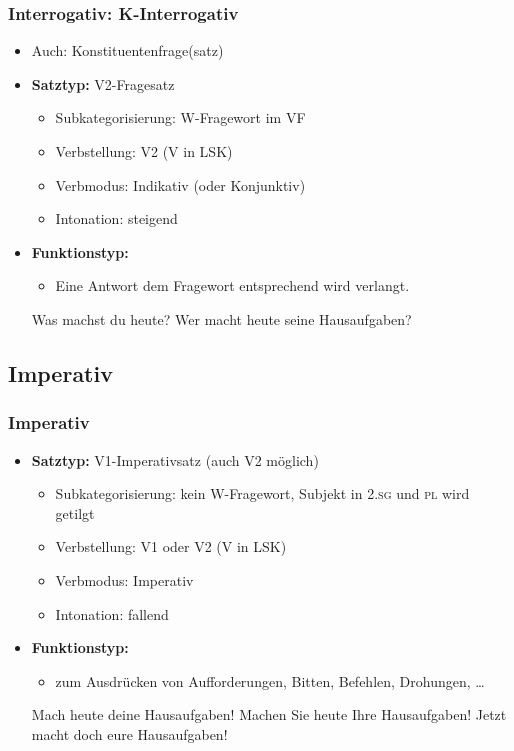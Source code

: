\begin{frame}
\frametitle{Interrogativ: K-Interrogativ}

\begin{itemize}
	\item Auch: Konstituentenfrage(satz)
	\item \textbf{Satztyp:} V2-Fragesatz
	\begin{itemize}
		\item Subkategorisierung: W-Fragewort im VF
		\item Verbstellung: V2 (V in LSK)
		\item Verbmodus: Indikativ (oder Konjunktiv)
		\item Intonation: steigend
	\end{itemize}
	\item \textbf{Funktionstyp:}
	\begin{itemize}
		\item Eine Antwort dem Fragewort entsprechend wird verlangt.
	\end{itemize}
	
	\eal
	\ex Was machst du heute?
	\ex Wer macht heute seine Hausaufgaben?
	\zl
	
\end{itemize}

\end{frame}


\subsection{Imperativ}


\begin{frame}
\frametitle{Imperativ}

\begin{itemize}
	\item \textbf{Satztyp:} V1-Imperativsatz (auch V2 möglich)
	\begin{itemize}
		\item Subkategorisierung: kein W-Fragewort, Subjekt in \textsc{2.sg} und \textsc{pl} wird getilgt
		\item Verbstellung: V1 oder V2 (V in LSK)
		\item Verbmodus: Imperativ
		\item Intonation: fallend
	\end{itemize}
	\item \textbf{Funktionstyp:}
	\begin{itemize}
		\item zum Ausdrücken von Aufforderungen, Bitten, Befehlen, Drohungen, \dots
	\end{itemize}
	
	\eal
	\ex Mach heute deine Hausaufgaben!
	\ex Machen Sie heute Ihre Hausaufgaben!
	\ex Jetzt macht doch eure Hausaufgaben!
	\zl
	
\end{itemize}

\end{frame}


